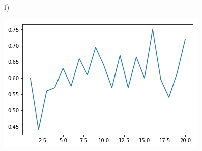 \documentclass[11pt,a4paper]{article}
\begin{document}
\begin{enumerate}
			f)
			\begin{center}
				\includegraphics[width=0.7\linewidth]{aggressive_plot}
			\end{center}
		\end{enumerate}
	
\end{document}
